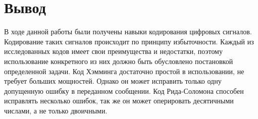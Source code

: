 \documentclass[a4paper,12pt]{article}
\begin{document}
\section{Вывод}

В ходе данной работы были получены навыки кодирования цифровых сигналов. Кодирование таких сигналов происходит по принципу избыточности. Каждый из исследованных кодов имеет свои преимущества и недостатки, поэтому использование конкретного из них должно быть обусловлено постановкой определенной задачи. Код Хэмминга достаточно простой в использовании, не требует больших мощностей. Однако он может исправить только одну допущенную ошибку в переданном сообщении. Код Рида-Соломона способен исправлять несколько ошибок, так же он может оперировать десятичными числами, а не только двоичными.
\end{document}
